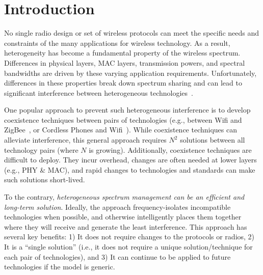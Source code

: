 
\section{Introduction}

No single radio design or set of wireless protocols can meet the specific needs and constraints of the many applications for wireless technology.  As a result, heterogeneity has become a fundamental property of the wireless spectrum.  Differences in physical layers, MAC layers, transmission powers, and spectral bandwidths are driven by these varying application requirements.  Unfortunately, differences in these properties break down spectrum sharing and can lead to significant interference between heterogeneous technologies~\cite{buzzbuzz,wifinet,airshark,rfsmog}. 

One popular approach to prevent such heterogeneous interference is to develop coexistence techniques between pairs of technologies (e.g., between Wifi and ZigBee~\cite{buzz buzz}, or Cordless Phones and Wifi~\cite{rfsmog}). While coexistence techniques can alleviate interference, this general approach requires $N^2$ solutions between all technology pairs (where $N$ is growing).  Additionally, coexistence techniques are difficult to deploy.  They incur overhead, changes are often needed at lower layers (e.g., PHY \& MAC), and rapid changes to  technologies and standards can make such solutions short-lived.

 
To the contrary, \emph{heterogeneous spectrum management can be an efficient and long-term solution}.  Ideally, the approach frequency-isolates incompatible technologies when possible, and otherwise intelligently places them together where they will receive and generate the least interference.  This approach has several key benefits:  1) It does not require changes to the protocols or radios, 2) It is a ``single solution'' (i.e., it does not require a unique solution/technique for each pair of technologies), and 3) It can continue to be applied to future technologies if the model is generic.

%
%
%
%
%

